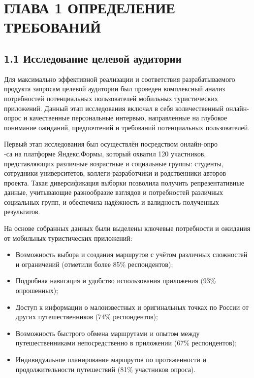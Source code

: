 \section{ГЛАВА 1 ОПРЕДЕЛЕНИЕ ТРЕБОВАНИЙ}

\subsection*{1.1 Исследование целевой аудитории}

Для максимально эффективной реализации и соответствия разрабатываемого продукта запросам целевой аудитории был проведен комплексный анализ потребностей потенциальных пользователей мобильных туристических приложений. Данный этап исследования включал в себя количественный онлайн-опрос и качественные персональные интервью, направленные на глубокое понимание ожиданий, предпочтений и требований потенциальных пользователей.

Первый этап исследования был осуществлён посредством онлайн-опро\\-са на платформе Яндекс.Формы, который охватил 120 участников, представляющих различные возрастные и социальные группы: студенты, сотрудники университетов, коллеги-разработчики и родственники авторов проекта. Такая диверсификация выборки позволила получить репрезентативные данные, учитывающие разнообразие взглядов и потребностей различных социальных групп, и обеспечила надёжность и валидность полученных результатов.

На основе собранных данных были выделены ключевые потребности и ожидания от мобильных туристических приложений:
\begin{itemize}
    \item Возможность выбора и создания маршрутов с учётом различных сложностей и ограничений (отметили более 85\% респондентов);
    \item Подробная навигация и удобство использования приложения (93\% опрошенных);
    \item Доступ к информации о малоизвестных и оригинальных точках по России от других путешественников (74\% респондентов);
    \item Возможность быстрого обмена маршрутами и опытом между путешественниками непосредственно в приложении (67\% респондентов);
    \item Индивидуальное планирование маршрутов по протяженности и продолжительности путешествий (81\% участников опроса).
\end{itemize}


